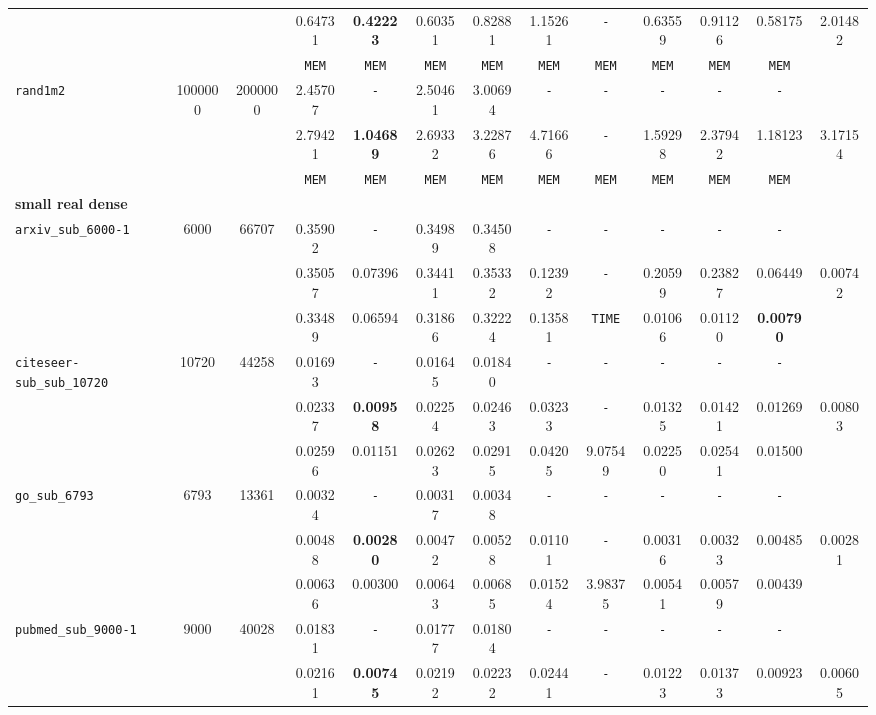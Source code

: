 \begin{table}
{\begin{tabular}{ l c c | c c c c c c c c c || c }
 &  &  & 0.64731 & \textbf{0.42223} & 0.60351 & 0.82881 & 1.15261 & \verb|-| & 0.63559 & 0.91126 & 0.58175 & 2.01482 \\
 &  &  & \verb|MEM| & \verb|MEM| & \verb|MEM| & \verb|MEM| & \verb|MEM| & \verb|MEM| & \verb|MEM| & \verb|MEM| & \verb|MEM| & \\
\hline
\verb|rand1m2| & 1000000 & 2000000 & 2.45707 & \verb|-| & 2.50461 & 3.00694 & \verb|-| & \verb|-| & \verb|-| & \verb|-| & \verb|-| & \\
 &  &  & 2.79421 & \textbf{1.04689} & 2.69332 & 3.22876 & 4.71666 & \verb|-| & 1.59298 & 2.37942 & 1.18123 & 3.17154 \\
 &  &  & \verb|MEM| & \verb|MEM| & \verb|MEM| & \verb|MEM| & \verb|MEM| & \verb|MEM| & \verb|MEM| & \verb|MEM| & \verb|MEM| & \\
\hline
\multicolumn{13}{l}{\textbf{small real dense}} \\
\hline
\verb|arxiv_sub_6000-1| & 6000 & 66707 & 0.35902 & \verb|-| & 0.34989 & 0.34508 & \verb|-| & \verb|-| & \verb|-| & \verb|-| & \verb|-| & \\
 &  &  & 0.35057 & 0.07396 & 0.34411 & 0.35332 & 0.12392 & \verb|-| & 0.20599 & 0.23827 & 0.06449 & 0.00742 \\
 &  &  & 0.33489 & 0.06594 & 0.31866 & 0.32224 & 0.13581 & \verb|TIME| & 0.01066 & 0.01120 & \textbf{0.00790} & \\
\hline
\verb|citeseer-sub_sub_10720| & 10720 & 44258 & 0.01693 & \verb|-| & 0.01645 & 0.01840 & \verb|-| & \verb|-| & \verb|-| & \verb|-| & \verb|-| & \\
 &  &  & 0.02337 & \textbf{0.00958} & 0.02254 & 0.02463 & 0.03233 & \verb|-| & 0.01325 & 0.01421 & 0.01269 & 0.00803 \\
 &  &  & 0.02596 & 0.01151 & 0.02623 & 0.02915 & 0.04205 & 9.07549 & 0.02250 & 0.02541 & 0.01500 & \\
\hline
\verb|go_sub_6793| & 6793 & 13361 & 0.00324 & \verb|-| & 0.00317 & 0.00348 & \verb|-| & \verb|-| & \verb|-| & \verb|-| & \verb|-| & \\
 &  &  & 0.00488 & \textbf{0.00280} & 0.00472 & 0.00528 & 0.01101 & \verb|-| & 0.00316 & 0.00323 & 0.00485 & 0.00281 \\
 &  &  & 0.00636 & 0.00300 & 0.00643 & 0.00685 & 0.01524 & 3.98375 & 0.00541 & 0.00579 & 0.00439 & \\
\hline
\verb|pubmed_sub_9000-1| & 9000 & 40028 & 0.01831 & \verb|-| & 0.01777 & 0.01804 & \verb|-| & \verb|-| & \verb|-| & \verb|-| & \verb|-| & \\
 &  &  & 0.02161 & \textbf{0.00745} & 0.02192 & 0.02232 & 0.02441 & \verb|-| & 0.01223 & 0.01373 & 0.00923 & 0.00605 \\

\end{tabular}}
\end{table}
